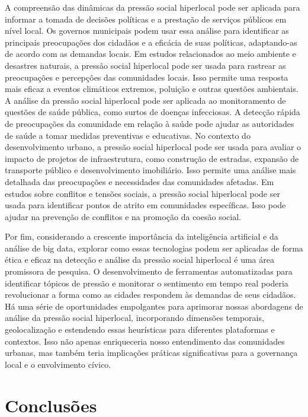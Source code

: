 A compreensão das dinâmicas da pressão social hiperlocal pode ser aplicada para informar a tomada de decisões políticas e a prestação de serviços públicos em nível local. Os governos municipais podem usar essa análise para identificar as principais preocupações dos cidadãos e a eficácia de suas políticas, adaptando-as de acordo com as demandas locais. Em estudos relacionados ao meio ambiente e desastres naturais, a pressão social hiperlocal pode ser usada para rastrear as preocupações e percepções das comunidades locais. Isso permite uma resposta mais eficaz a eventos climáticos extremos, poluição e outras questões ambientais. A análise da pressão social hiperlocal pode ser aplicada ao monitoramento de questões de saúde pública, como surtos de doenças infecciosas. A detecção rápida de preocupações da comunidade em relação à saúde pode ajudar as autoridades de saúde a tomar medidas preventivas e educativas. No contexto do desenvolvimento urbano, a pressão social hiperlocal pode ser usada para avaliar o impacto de projetos de infraestrutura, como construção de estradas, expansão de transporte público e desenvolvimento imobiliário. Isso permite uma análise mais detalhada das preocupações e necessidades das comunidades afetadas. Em estudos sobre conflitos e tensões sociais, a pressão social hiperlocal pode ser usada para identificar pontos de atrito em comunidades específicas. Isso pode ajudar na prevenção de conflitos e na promoção da coesão social.

Por fim, considerando a crescente importância da inteligência artificial e da análise de big data, explorar como essas tecnologias podem ser aplicadas de forma ética e eficaz na detecção e análise da pressão social hiperlocal é uma área promissora de pesquisa. O desenvolvimento de ferramentas automatizadas para identificar tópicos de pressão e monitorar o sentimento em tempo real poderia revolucionar a forma como as cidades respondem às demandas de seus cidadãos. Há uma série de oportunidades empolgantes para aprimorar nossas abordagens de análise da pressão social hiperlocal, incorporando dimensões temporais, geolocalização e estendendo essas heurísticas para diferentes plataformas e contextos. Isso não apenas enriqueceria nosso entendimento das comunidades urbanas, mas também teria implicações práticas significativas para a governança local e o envolvimento cívico.

\section{Conclusões}

